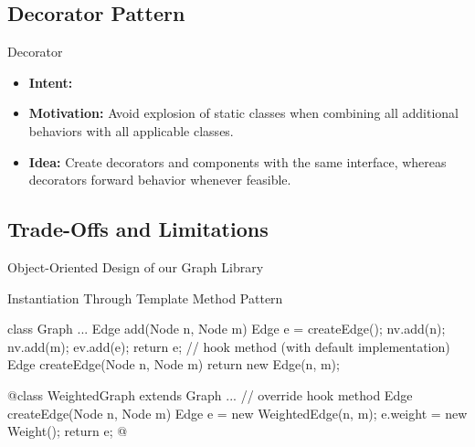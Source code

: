 \subsection{Decorator Pattern}
\begin{frame}{\myframetitle}
	\begin{mycolumns}[widths={40}]
		\begin{definition}{Decorator }
			\begin{itemize}
				\item {\bf Intent:} 
				\item {\bf Motivation:} Avoid explosion of static classes when combining all additional behaviors with all applicable classes.
				\item {\bf Idea:} Create decorators and components with the same interface, whereas decorators forward behavior whenever feasible.
			\end{itemize}
		\end{definition}
	\mynextcolumn
	\end{mycolumns}
\end{frame}

\subsection{Trade-Offs and Limitations}

\begin{frame}{Object-Oriented Design of our Graph Library}
	\begin{mycolumns}[widths={40}]
	\mynextcolumn
	\end{mycolumns}
\end{frame}

\begin{frame}[fragile]{Instantiation Through Template Method Pattern}
	\small
	\begin{mycolumns}[widths={45}]
\begin{codetight}{}
class Graph {
	...
	Edge add(Node n, Node m) {
		Edge e = createEdge();
		nv.add(n); nv.add(m); ev.add(e);
		return e;
	}
	// hook method (with default implementation)
	Edge createEdge(Node n, Node m) {
		return new Edge(n, m);
	}
}
\end{codetight}
\begin{codetight}{}
@class WeightedGraph extends Graph {
	...
	// override hook method
	Edge createEdge(Node n, Node m) {
		Edge e = new WeightedEdge(n, m);
		e.weight = new Weight();
		return e;
	}
}@
\end{codetight}
	\mynextcolumn
		\centering{}
	\end{mycolumns}
\end{frame}

